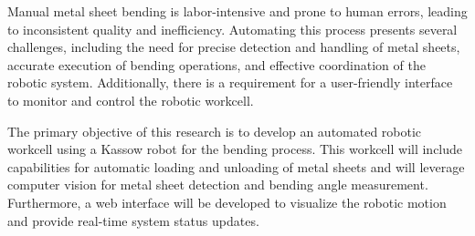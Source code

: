 Manual metal sheet bending is labor-intensive and prone to human errors, leading to inconsistent quality and inefficiency. Automating this process presents several challenges, including the need for precise detection and handling of metal sheets, accurate execution of bending operations, and effective coordination of the robotic system. Additionally, there is a requirement for a user-friendly interface to monitor and control the robotic workcell.

The primary objective of this research is to develop an automated robotic workcell using a Kassow robot for the bending process. This workcell will include capabilities for automatic loading and unloading of metal sheets and will leverage computer vision for metal sheet detection and bending angle measurement. Furthermore, a web interface will be developed to visualize the robotic motion and provide real-time system status updates.
